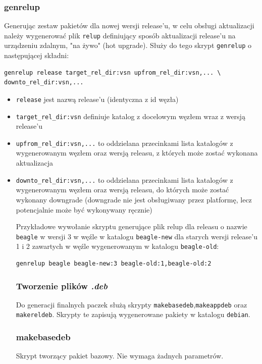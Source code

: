 \documentclass[polish,12pt]{aghthesis}
\begin{document}
\subsubsection{genrelup}

Generując zestaw pakietów dla nowej wersji release'u, w celu obsługi aktualizacji należy wygenerować plik \texttt{relup} definiujący sposób aktualizacji release'u na urządzeniu zdalnym, "na żywo" (hot upgrade). Służy do tego skrypt \texttt{genrelup} o następującej składni:
\begin{verbatim}
genrelup release target_rel_dir:vsn upfrom_rel_dir:vsn,... \
downto_rel_dir:vsn,...
\end{verbatim}

\begin{itemize}
\item \texttt{release} jest nazwą release'u (identyczna z id węzła)
\item \texttt{target\_rel\_dir:vsn} definiuje katalog z docelowym węzłem wraz z wersją release'u
\item \texttt{upfrom\_rel\_dir:vsn,...} to oddzielana przecinkami lista katalogów z wygenerowanym węzłem oraz wersją releasu, z których może zostać wykonana aktualizacja
\item \texttt{downto\_rel\_dir:vsn,...} to oddzielana przecinkami lista katalogów z wygenerowanym węzłem oraz wersją releasu, do których może zostać wykonany downgrade (downgrade nie jest obsługiwany przez platformę, lecz potencjalnie może być wykonywany ręcznie)

Przykładowe wywołanie skryptu generujące plik relup dla releasu o nazwie \texttt{beagle} w wersji 3 w węźle w katalogu \texttt{beagle-new} dla starych wersji release'u 1 i 2 zawartych w węźle wygenerowanym w katalogu \texttt{beagle-old}:
\begin{verbatim}
genrelup beagle beagle-new:3 beagle-old:1,beagle-old:2
\end{verbatim}
\subsubsection{Tworzenie plików \emph{.deb}}
Do generacji finalnych paczek służą skrypty \texttt{makebasedeb},\texttt{makeappdeb} oraz \texttt{makereldeb}. Skrypty te zapisują wygenerowane pakiety w katalogu \texttt{debian}.
\subsubsection{makebasedeb}
Skrypt tworzący pakiet bazowy. Nie wymaga żadnych parametrów.

\end{itemize}
\end{document}
